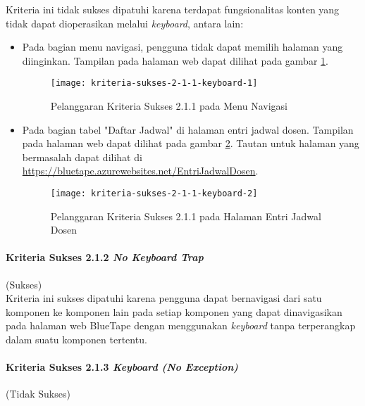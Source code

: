 Kriteria ini tidak sukses dipatuhi karena terdapat fungsionalitas konten yang tidak dapat dioperasikan melalui \textit{keyboard}, antara lain:

\begin{itemize}
    \item Pada bagian menu navigasi, pengguna tidak dapat memilih halaman yang diinginkan. Tampilan pada halaman web dapat dilihat pada gambar \ref{fig:2.1.1_keyboard_1}.
    \begin{figure}[H]
        \centering  
        \texttt{[image: kriteria-sukses-2-1-1-keyboard-1]}  
        \caption[Pelanggaran Kriteria Sukses 2.1.1 pada Menu Navigasi]{Pelanggaran Kriteria Sukses 2.1.1 pada Menu Navigasi}
        \label{fig:2.1.1_keyboard_1}  
    \end{figure} 

    \item Pada bagian tabel "Daftar Jadwal" di halaman entri jadwal dosen. Tampilan pada halaman web dapat dilihat pada gambar \ref{fig:2.1.1_keyboard_2}. Tautan untuk halaman yang bermasalah dapat dilihat di \url{https://bluetape.azurewebsites.net/EntriJadwalDosen}.
    \begin{figure}[H]
        \centering  
        \texttt{[image: kriteria-sukses-2-1-1-keyboard-2]}  
        \caption[Pelanggaran Kriteria Sukses 2.1.1 pada Halaman Entri Jadwal Dosen]{Pelanggaran Kriteria Sukses 2.1.1 pada Halaman Entri Jadwal Dosen}
        \label{fig:2.1.1_keyboard_2}  
    \end{figure} 
\end{itemize}

\paragraph{Kriteria Sukses 2.1.2 \textit{No Keyboard Trap}}
\label{par:kepatuhan_bluetape_kriteria_sukses_2.1.2}
(Sukses)\\

Kriteria ini sukses dipatuhi karena pengguna dapat bernavigasi dari satu komponen ke komponen lain pada setiap komponen yang dapat dinavigasikan pada halaman web BlueTape dengan menggunakan \textit{keyboard} tanpa terperangkap dalam suatu komponen tertentu.

\paragraph{Kriteria Sukses 2.1.3 \textit{Keyboard (No Exception)}}
\label{par:kepatuhan_bluetape_kriteria_sukses_2.1.3}
(Tidak Sukses)\\

